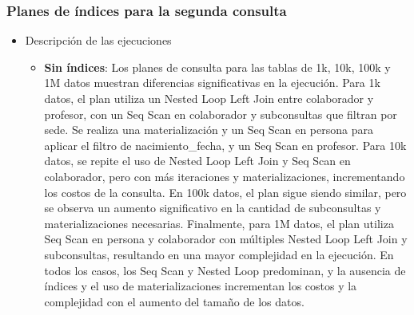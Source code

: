 \subsubsection{Planes de índices para la segunda consulta}
\begin{itemize}
	\item{Descripción de las ejecuciones}
	      \begin{itemize}
		      \item {\textbf{Sin índices}: Los planes de consulta para las tablas de 1k, 10k, 100k y 1M datos muestran diferencias significativas en la ejecución. Para 1k datos, el plan utiliza un Nested Loop Left Join entre colaborador y profesor, con un Seq Scan en colaborador y subconsultas que filtran por sede. Se realiza una materialización y un Seq Scan en persona para aplicar el filtro de nacimiento\_fecha, y un Seq Scan en profesor. Para 10k datos, se repite el uso de Nested Loop Left Join y Seq Scan en colaborador, pero con más iteraciones y materializaciones, incrementando los costos de la consulta. En 100k datos, el plan sigue siendo similar, pero se observa un aumento significativo en la cantidad de subconsultas y materializaciones necesarias. Finalmente, para 1M datos, el plan utiliza Seq Scan en persona y colaborador con múltiples Nested Loop Left Join y subconsultas, resultando en una mayor complejidad en la ejecución. En todos los casos, los Seq Scan y Nested Loop predominan, y la ausencia de índices y el uso de materializaciones incrementan los costos y la complejidad con el aumento del tamaño de los datos.}

\end{itemize}
\end{itemize}
